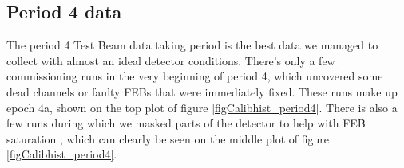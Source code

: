 \documentclass[12pt,a4paper]{article}
\begin{document}
\FloatBarrier
\subsection{Period 4 data}\label{secTBPeriod4}

The period 4 Test Beam data taking period is the best data we managed to collect with almost an ideal detector conditions. There's only a few commissioning runs in the very beginning of period 4, which uncovered some dead channels or faulty FEBs that were immediately fixed. These runs make up epoch 4a, shown on the top plot of figure \ref{figCalibhist_period4}. There is also a few runs during which we masked parts of the detector to help with FEB saturation \cite{NOVA-doc-53658}, which can clearly be seen on the middle plot of figure \ref{figCalibhist_period4}.
\end{document}
